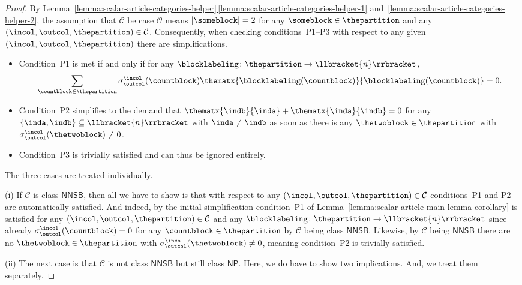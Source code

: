 \documentclass[10pt,a4paper]{amsart}
\numberwithin{equation}{section}
\newcommand{\funcdef}{\colon}
\newcommand{\dwi}[1]{\llbracket{#1}\rrbracket}
\newcommand{\xfromto}[3]{#1 \colon  #2 \to #3}
\newcommand{\csx}[3]{\sigma^{#1}_{#2}(#3)}
\newcommand{\thedim}{n}
\newcommand{\thecat}{\mathcal{C}}
\newcommand{\conditionone}{P1}
\newcommand{\conditiontwo}{P2}
\newcommand{\conditionthree}{P3}
\newcommand{\onlyneutralnonsingletonblocks}{\mathsf{NNSB}}
\newcommand{\onlyneutralpartitions}{\mathsf{NP}}
\begin{document}
{\begin{proof}
  By Lem\-ma~\hyperref[lemma:scalar-article-categories-helper-1]{\ref*{lemma:scalar-article-categories-helper}\,\ref*{lemma:scalar-article-categories-helper-1}} and~\ref{lemma:scalar-article-categories-helper-2}, the assumption that $\thecat$ be case $\mathcal{O}$  means $|\someblock|=2$ for any $\someblock\in\thepartition$ and any $(\incol,\outcol,\thepartition)\in\thecat$. Consequently, when checking  conditions~\conditionone{}--\conditionthree{} with respect to any given $(\incol,\outcol,\thepartition)$ there are simplifications.
  \begin{itemize}
  \item Condition~\conditionone{} is met if and only if for any $\blocklabeling\funcdef\thepartition\to\dwi{\thedim}$,
                \[
                \sum_{\countblock\in\thepartition}\csx{\incol}{\outcol}{\countblock}
        \thematx{\blocklabeling(\countblock)}{\blocklabeling(\countblock)}=0.
      \]
\item    Condition~\conditiontwo{} simplifies to the demand that $\thematx{\indb}{\inda}+\thematx{\inda}{\indb}=0$ for any $\{\inda,\indb\}\subseteq \dwi{\thedim}$ with $\inda\neq \indb$ as soon as there is any $\thetwoblock\in \thepartition$ with $\csx{\incol}{\outcol}{\thetwoblock}\neq 0$.
\item    Condition~\conditionthree{}  is trivially satisfied  and can thus be ignored entirely.
  \end{itemize}
  The three cases are treated individually.

  (i)
  If $\thecat$ is class $\onlyneutralnonsingletonblocks$, then all we have to show is that with respect to any $(\incol,\outcol,\thepartition)\in\thecat$ con\-di\-tions~\conditionone{} and \conditiontwo{} are automatically satisfied. And indeed, by the initial simplification condition~\conditionone{} of Lem\-ma~\ref{lemma:scalar-article-main-lemma-corollary} is satisfied for any $(\incol,\outcol,\thepartition)\in\thecat$ and any $\xfromto{\blocklabeling}{\thepartition}{\dwi{\thedim}}$ since already $\csx{\incol}{\outcol}{\countblock}=0$ for any $\countblock\in\thepartition$ by $\thecat$ being class $\onlyneutralnonsingletonblocks$. Likewise, by $\thecat$ being $\onlyneutralnonsingletonblocks$ there are no $\thetwoblock\in\thepartition$ with $\csx{\incol}{\outcol}{\thetwoblock}\neq 0$, meaning  con\-di\-tion~\conditiontwo{} is trivially satisfied.

  (ii)
  The next case is that $\thecat$ is not class $\onlyneutralnonsingletonblocks$ but still class $\onlyneutralpartitions$. Here, we do have to show two implications. And, we  treat them separately.


\end{proof}}
\end{document}
